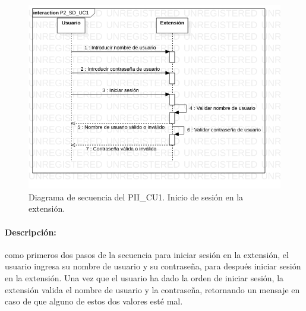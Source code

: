 \documentclass[12pt, a4paper, titlepage]{report}
\begin{document}
    		    \begin{figure}[H]
    				\begin{center}    		    	\includegraphics[width=15cm]{./imagenes/Desarrollo/Prototipo_2/P2_SD_UC1.png}
    				\caption[Diagrama de secuencia 1 del Prototipo II]{Diagrama de secuencia del PII\_CU1. Inicio de sesión en la extensión.}
    				\end{center}
    			\end{figure}
    			
			    \paragraph{Descripción:}
			    como primeros dos pasos de la secuencia para iniciar sesión en la extensión, el usuario ingresa su nombre de usuario y su contraseña, para después iniciar sesión en la extensión. Una vez que el usuario ha dado la orden de iniciar sesión, la extensión valida el nombre de usuario y la contraseña, retornando un mensaje en caso de que alguno de estos dos valores esté mal. 
    			
\end{document}
